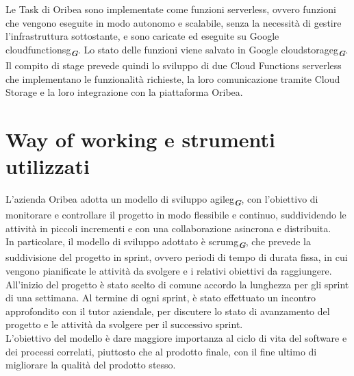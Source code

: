 Le Task di Oribea sono implementate come funzioni serverless, ovvero funzioni che vengono eseguite in modo autonomo e scalabile, senza la necessità di gestire l'infrastruttura sottostante, e sono caricate ed eseguite su Google \gls{cloudfunctionsg}\textsubscript{\textbf{\textit{G}}}. Lo stato delle funzioni viene salvato in Google \gls{cloudstorageg}\textsubscript{\textbf{\textit{G}}}. Il compito di stage prevede quindi lo sviluppo di due Cloud Functions serverless che implementano le funzionalità richieste, la loro comunicazione tramite Cloud Storage e la loro integrazione con la piattaforma Oribea.\\


\section{Way of working e strumenti utilizzati}
\label{sec:way-of-working}

L’azienda Oribea adotta un modello di sviluppo \gls{agileg}\textsubscript{\textbf{\textit{G}}}, con l’obiettivo di monitorare e controllare il progetto in modo flessibile e continuo, suddividendo le attività in piccoli incrementi e con una collaborazione asincrona e distribuita.\\
In particolare, il modello di sviluppo adottato è \gls{scrumg}\textsubscript{\textbf{\textit{G}}}, che prevede la suddivisione del progetto in sprint, ovvero periodi di tempo di durata fissa, in cui vengono pianificate le attività da svolgere e i relativi obiettivi da raggiungere. All'inizio del progetto è stato scelto di comune accordo la lunghezza per gli sprint di una settimana. Al termine di ogni sprint, è stato effettuato un incontro approfondito con il tutor aziendale, per discutere lo stato di avanzamento del progetto e le attività da svolgere per il successivo sprint.\\
L’obiettivo del modello è dare maggiore importanza al ciclo di vita del software e dei processi correlati, piuttosto che al prodotto finale, con il fine ultimo di migliorare la qualità del prodotto stesso.\\

